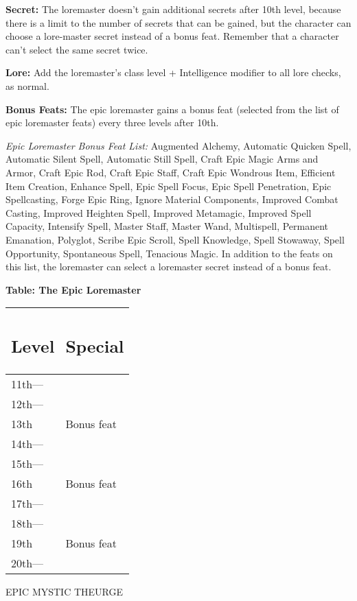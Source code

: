 \documentclass{article}
\begin{document}
\textbf{Secret:} The loremaster doesn't gain additional secrets after 10th level, 
because there is a limit to the number of secrets that can be gained, but the character 
can choose a lore-master secret instead of a bonus feat. Remember that a character 
can't select the same secret twice. 

\textbf{Lore:} Add the loremaster's class level + Intelligence modifier to all 
lore checks, as normal. 

\textbf{Bonus Feats:} The epic loremaster gains a bonus feat (selected from the 
list of epic loremaster feats) every three levels after 10th. 

\textit{Epic Loremaster Bonus Feat List: }Augmented Alchemy, Automatic Quicken 
Spell, Automatic Silent Spell, Automatic Still Spell, Craft Epic Magic Arms and 
Armor, Craft Epic Rod, Craft Epic Staff, Craft Epic Wondrous Item, Efficient Item 
Creation, Enhance Spell, Epic Spell Focus, Epic Spell Penetration, Epic Spellcasting, 
Forge Epic Ring, Ignore Material Components, Improved Combat Casting, Improved 
Heighten Spell, Improved Metamagic, Improved Spell Capacity, Intensify Spell, Master 
Staff, Master Wand, Multispell, Permanent Emanation, Polyglot, Scribe Epic Scroll, 
Spell Knowledge, Spell Stowaway, Spell Opportunity, Spontaneous Spell, Tenacious 
Magic. In addition to the feats on this list, the loremaster can select a loremaster 
secret instead of a bonus feat. 

\textbf{Table: The Epic Loremaster }

\begin{tabular}{|>{\raggedright}p{27pt}|>{\raggedright}p{49pt}|}
\hline
\subsection*{L\textbf{evel}} & \subsection*{S\textbf{pecial }}\tabularnewline
\hline
11th--- &  \tabularnewline
\hline
12th--- &  \tabularnewline
\hline
13th & Bonus feat \tabularnewline
\hline
14th--- &  \tabularnewline
\hline
15th--- &  \tabularnewline
\hline
16th & Bonus feat \tabularnewline
\hline
17th--- &  \tabularnewline
\hline
18th--- &  \tabularnewline
\hline
19th & Bonus feat \tabularnewline
\hline
20th--- &  \tabularnewline
\hline
\end{tabular}

\vspace{12pt}
{\LARGE{}EPIC MYSTIC THEURGE}
\end{document}
